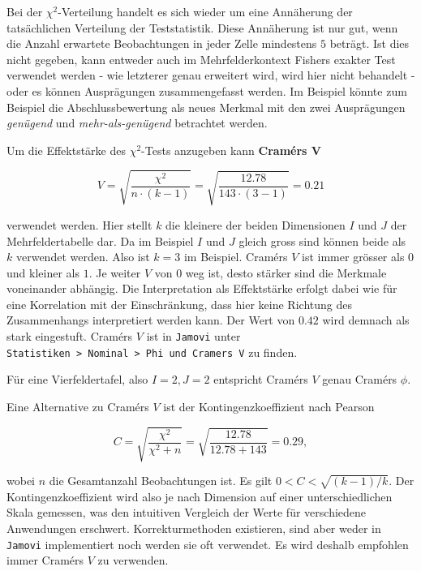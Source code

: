 \documentclass[
]{book}
\theoremstyle{definition}
\theoremstyle{definition}
\theoremstyle{definition}
\theoremstyle{definition}
\theoremstyle{remark}
\begin{document}
Bei der \(\chi^2\)-Verteilung handelt es sich wieder um eine Annäherung der tatsächlichen Verteilung der Teststatistik. Diese Annäherung ist nur gut, wenn die Anzahl erwartete Beobachtungen in jeder Zelle mindestens \(5\) beträgt. Ist dies nicht gegeben, kann entweder auch im Mehrfelderkontext Fishers exakter Test verwendet werden - wie letzterer genau erweitert wird, wird hier nicht behandelt - oder es können Ausprägungen zusammengefasst werden. Im Beispiel könnte zum Beispiel die Abschlussbewertung als neues Merkmal mit den zwei Ausprägungen \emph{genügend} und \emph{mehr-als-genügend} betrachtet werden.

\label{customdef-cramers-v}{Um die Effektstärke des \(\chi^2\)-Tests anzugeben kann \textbf{Cramérs V}}

\[V = \sqrt{\frac{\chi^2}{n\cdot (k-1)}} = \sqrt{\frac{12.78}{143\cdot (3-1)}} = 0.21\]

verwendet werden. Hier stellt \(k\) die kleinere der beiden Dimensionen \(I\) und \(J\) der Mehrfeldertabelle dar. Da im Beispiel \(I\) und \(J\) gleich gross sind können beide als \(k\) verwendet werden. Also ist \(k = 3\) im Beispiel. Cramérs \(V\) ist immer grösser als \(0\) und kleiner als \(1\). Je weiter \(V\) von \(0\) weg ist, desto stärker sind die Merkmale voneinander abhängig. Die Interpretation als Effektstärke erfolgt dabei wie für eine Korrelation mit der Einschränkung, dass hier keine Richtung des Zusammenhangs interpretiert werden kann. Der Wert von \(0.42\) wird demnach als stark eingestuft. Cramérs \(V\) ist in \texttt{Jamovi} unter \texttt{Statistiken\ \textgreater{}\ Nominal\ \textgreater{}\ Phi\ und\ Cramer\textquotesingle{}s\ V} zu finden.

Für eine Vierfeldertafel, also \(I = 2, J = 2\) entspricht Cramérs \(V\) genau Cramérs \(\phi\).

Eine Alternative zu Cramérs \(V\) ist der Kontingenzkoeffizient nach Pearson

\[C = \sqrt{\frac{\chi^2}{\chi^2+n}} = \sqrt{\frac{12.78}{12.78+143}} = 0.29, \]

wobei \(n\) die Gesamtanzahl Beobachtungen ist. Es gilt \(0 < C < \sqrt{(k-1)/k}\). Der Kontingenzkoeffizient wird also je nach Dimension auf einer unterschiedlichen Skala gemessen, was den intuitiven Vergleich der Werte für verschiedene Anwendungen erschwert. Korrekturmethoden existieren, sind aber weder in \texttt{Jamovi} implementiert noch werden sie oft verwendet. Es wird deshalb empfohlen immer Cramérs \(V\) zu verwenden.
\end{document}

